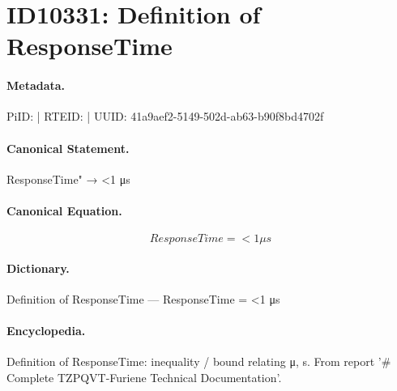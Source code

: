 \section*{ID10331: Definition of ResponseTime}
\paragraph{Metadata.}
PiID:  | RTEID:  | UUID: 41a9aef2-5149-502d-ab63-b90f8bd4702f

\paragraph{Canonical Statement.}
ResponseTime" → <1 μs

\paragraph{Canonical Equation.}
\[
ResponseTime = <1 μs
\]

\paragraph{Dictionary.}
Definition of ResponseTime — ResponseTime = <1 μs

\paragraph{Encyclopedia.}
Definition of ResponseTime: inequality / bound relating μ, s. From report '\# Complete TZPQVT-Furiene Technical Documentation'.
